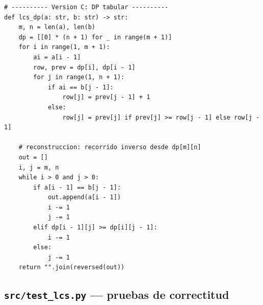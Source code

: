 \documentclass[11pt,a4paper]{article}
\begin{document}
\begin{lstlisting}[style=py, caption={\texttt{src/lcs.py}}]
# ---------- Version C: DP tabular ----------
def lcs_dp(a: str, b: str) -> str:
    m, n = len(a), len(b)
    dp = [[0] * (n + 1) for _ in range(m + 1)]
    for i in range(1, m + 1):
        ai = a[i - 1]
        row, prev = dp[i], dp[i - 1]
        for j in range(1, n + 1):
            if ai == b[j - 1]:
                row[j] = prev[j - 1] + 1
            else:
                row[j] = prev[j] if prev[j] >= row[j - 1] else row[j - 1]

    # reconstruccion: recorrido inverso desde dp[m][n]
    out = []
    i, j = m, n
    while i > 0 and j > 0:
        if a[i - 1] == b[j - 1]:
            out.append(a[i - 1])
            i -= 1
            j -= 1
        elif dp[i - 1][j] >= dp[i][j - 1]:
            i -= 1
        else:
            j -= 1
    return "".join(reversed(out))
\end{lstlisting}

\subsection{\texttt{src/test\_lcs.py} — pruebas de correctitud}\label{anexo:test}
\end{document}
